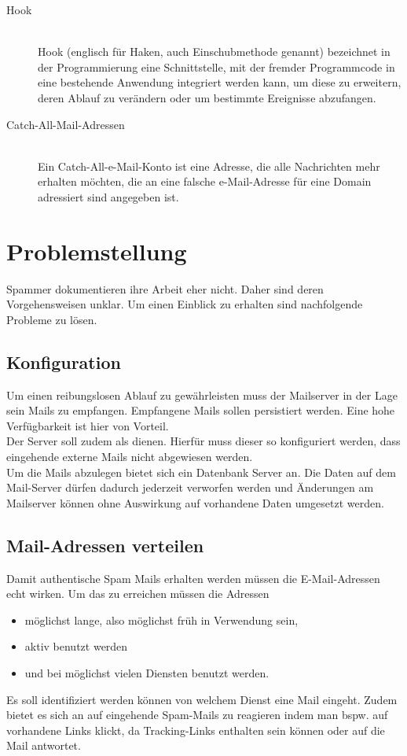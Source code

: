 \documentclass[a4paper,11pt,singlespacing]{article}
\begin{document}
\begin{description}
	\item[Hook\label{itm:Hook}]\hfill \\
		Hook (englisch für Haken, auch Einschubmethode genannt) bezeichnet in der Programmierung eine Schnittstelle, mit der fremder Programmcode in eine bestehende Anwendung integriert werden kann, um diese zu erweitern, deren Ablauf zu verändern oder um bestimmte Ereignisse abzufangen.\cite{Hook}
	\item[Catch-All-Mail-Adressen\label{itm:Catch-All-Mail}]\hfill \\
		Ein Catch-All-e-Mail-Konto ist eine Adresse, die alle Nachrichten mehr erhalten möchten, die an eine falsche e-Mail-Adresse für eine Domain adressiert sind angegeben ist.\cite{Catch-All-Mail}
	\end{description}


\section{Problemstellung}\label{sec:Problemstellung}
	Spammer dokumentieren ihre Arbeit eher nicht.
	Daher sind deren Vorgehensweisen unklar.
	Um einen Einblick zu erhalten sind nachfolgende Probleme zu lösen.

	\subsection{Konfiguration}\label{sec:ProblemstellungKonfiguration}
		Um einen reibungslosen Ablauf zu gewährleisten muss der Mailserver in der Lage sein Mails zu empfangen.
		Empfangene Mails sollen persistiert werden.
		Eine hohe Verfügbarkeit ist hier von Vorteil.
		\\
		Der Server soll zudem als  dienen.
		Hierfür muss dieser so konfiguriert werden, dass eingehende externe Mails nicht abgewiesen werden.
		\\
		Um die Mails abzulegen bietet sich ein Datenbank Server an.
		Die Daten auf dem Mail-Server dürfen dadurch jederzeit verworfen werden und Änderungen am Mailserver können ohne Auswirkung auf vorhandene Daten umgesetzt werden.

	\subsection{Mail-Adressen verteilen}\label{sec:ProblemstellungMailsVerteilen}
		Damit authentische Spam Mails erhalten werden müssen die E-Mail-Adressen echt wirken.
		Um das zu erreichen müssen die Adressen
		\begin{itemize}
		\item möglichst lange, also möglichst früh in Verwendung sein,
		\item aktiv benutzt werden
		\item und bei möglichst vielen Diensten benutzt werden.
		\end{itemize}
		Es soll identifiziert werden können von welchem Dienst eine Mail eingeht.
		Zudem bietet es sich an auf eingehende Spam-Mails zu reagieren indem man bspw. auf vorhandene Links klickt, da Tracking-Links enthalten sein können oder auf die Mail antwortet. %
\end{document}
